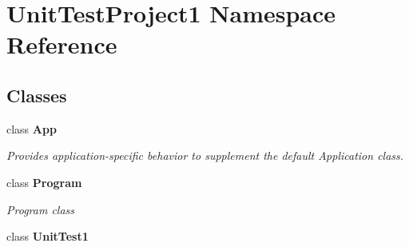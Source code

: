 \section{Unit\+Test\+Project1 Namespace Reference}
\label{namespaceUnitTestProject1}
\subsection*{Classes}
\begin{DoxyCompactItemize}
\item 
class \textbf{ App}
\begin{DoxyCompactList}\small\item\em Provides application-\/specific behavior to supplement the default Application class. \end{DoxyCompactList}\item 
class {\bfseries Program}
\begin{DoxyCompactList}\small\item\em Program class \end{DoxyCompactList}\item 
class \textbf{ Unit\+Test1}
\end{DoxyCompactItemize}
